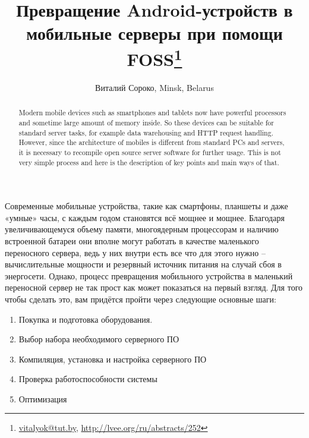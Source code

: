 \documentclass[10pt, a5paper]{article}
\begin{document}
\title{Превращение Android-устройств в мобильные серверы при помощи FOSS\footnote{\url{vitalyok@tut.by}, \url{http://lvee.org/ru/abstracts/252}}}
\author{Виталий Сороко, Minsk, Belarus}
\maketitle
\begin{abstract}
Modern mobile devices such as smartphones and tablets now have powerful processors and sometime large amount of memory inside.  So these devices can be suitable for standard server tasks, for example data warehousing and HTTP request handling. However, since the architecture of mobiles is different from standard PCs and servers, it is necessary to recompile open source server software  for further usage. This is not very simple process and here is the description of key points and main ways of that.
\end{abstract}
Современные мобильные устройства, такие как смартфоны, планшеты и даже «умные» часы, с каждым годом становятся всё мощнее и мощнее. Благодаря увеличивающемуся объему памяти, многоядерным процессорам и наличию встроенной батареи они вполне могут работать в качестве маленького переносного сервера, ведь у них внутри есть все что для этого нужно – вычислительные мощности и резервный источник питания на случай сбоя в энергосети. Однако, процесс превращения мобильного устройства в маленький переносной сервер не так прост как может показаться на первый взгляд.  Для того чтобы сделать это, вам придётся пройти через следующие основные шаги:

\begin{enumerate}
  \item Покупка и подготовка оборудования.
  \item Выбор набора необходимого серверного ПО
  \item Компиляция, установка и настройка серверного ПО
  \item Проверка работоспособности системы
  \item Оптимизация
\end{enumerate}
\end{document}
